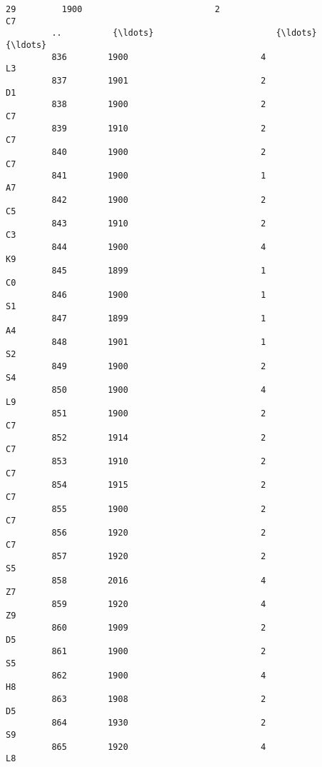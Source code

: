 \documentclass[11pt]{article}
\begin{document}
\begin{Verbatim}[commandchars=\\\{\}]
         29         1900                          2                              C7   
         ..          {\ldots}                        {\ldots}                             {\ldots}   
         836        1900                          4                              L3   
         837        1901                          2                              D1   
         838        1900                          2                              C7   
         839        1910                          2                              C7   
         840        1900                          2                              C7   
         841        1900                          1                              A7   
         842        1900                          2                              C5   
         843        1910                          2                              C3   
         844        1900                          4                              K9   
         845        1899                          1                              C0   
         846        1900                          1                              S1   
         847        1899                          1                              A4   
         848        1901                          1                              S2   
         849        1900                          2                              S4   
         850        1900                          4                              L9   
         851        1900                          2                              C7   
         852        1914                          2                              C7   
         853        1910                          2                              C7   
         854        1915                          2                              C7   
         855        1900                          2                              C7   
         856        1920                          2                              C7   
         857        1920                          2                              S5   
         858        2016                          4                              Z7   
         859        1920                          4                              Z9   
         860        1909                          2                              D5   
         861        1900                          2                              S5   
         862        1900                          4                              H8   
         863        1908                          2                              D5   
         864        1930                          2                              S9   
         865        1920                          4                              L8   
         

\end{Verbatim}
\end{document}
